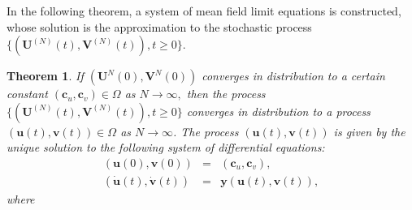\documentclass[12pt]{article}
\newtheorem{theorem}{Theorem}[section]
\newcommand{\blue}[1]{\textcolor{blue}{#1}}
\begin{document}
In the following theorem, a system of mean field limit equations is constructed, whose solution is the approximation to the stochastic process $\{(\textbf{U}^{(N)}(t), \textbf{V}^{(N)}(t)), t\geq0\}$.
\begin{theorem}\label{limiting process}
If $\displaystyle(\textbf{U}^{N}(0),\textbf{V}^{N}(0))$ converges in distribution to a certain constant $\displaystyle(\textbf{c}_{u},\textbf{c}_{v})\in \Omega$ as $N\longrightarrow\infty,$
then the process $\displaystyle \{(\textbf{U}^{(N)}(t), \textbf{V}^{(N)}(t)),t\geq 0\}$ converges in distribution to a process $(\textbf{u}(t),\textbf{v}(t))\in\Omega$ as $N\longrightarrow\infty$. The process $(\textbf{u}(t),\textbf{v}(t))$ is given by the unique solution to the following system of differential equations:
\begin{eqnarray}
 \label{d1} \displaystyle(\textbf{u}(0),\textbf{v}(0)) &=& (\textbf{c}_{u},\textbf{c}_{v}), \\
  \label{d2}\displaystyle (\dot{\textbf{u}}(t),\dot{\textbf{v}}(t))&=&\textbf{y}(\textbf{u}(t),\textbf{v}(t)),
\end{eqnarray}
where %


\end{theorem}
\end{document}
